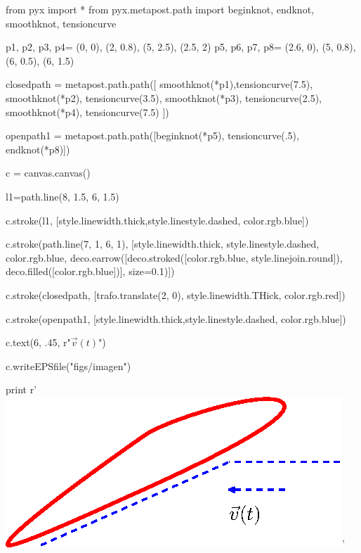\documentclass[12pt]{report}
\begin{document}
    \begin{python}
from pyx import *
from pyx.metapost.path import beginknot, endknot, smoothknot, tensioncurve


p1, p2, p3, p4= (0, 0), (2, 0.8), (5, 2.5), (2.5, 2)
p5, p6, p7, p8= (2.6, 0), (5, 0.8), (6, 0.5), (6, 1.5)

closedpath = metapost.path.path([
    smoothknot(*p1),tensioncurve(7.5), 
    smoothknot(*p2), tensioncurve(3.5),
    smoothknot(*p3), tensioncurve(2.5), 
    smoothknot(*p4), tensioncurve(7.5)
])

openpath1 = metapost.path.path([beginknot(*p5), tensioncurve(.5),  endknot(*p8)])

c = canvas.canvas()

l1=path.line(8, 1.5, 6, 1.5)

c.stroke(l1, [style.linewidth.thick,style.linestyle.dashed, color.rgb.blue])

c.stroke(path.line(7, 1, 6, 1),
         [style.linewidth.thick, 
           style.linestyle.dashed, color.rgb.blue,
           deco.earrow([deco.stroked([color.rgb.blue, 
           style.linejoin.round]), deco.filled([color.rgb.blue])], 
           size=0.1)])

c.stroke(closedpath, [trafo.translate(2, 0), style.linewidth.THick, color.rgb.red])

c.stroke(openpath1, [style.linewidth.thick,style.linestyle.dashed, color.rgb.blue])

c.text(6, .45, r"$\vec{v}(t)$")

c.writeEPSfile("figs/imagen")

print r'\includegraphics[scale=1]{figs/imagen}'
\end{python}
\end{document}

